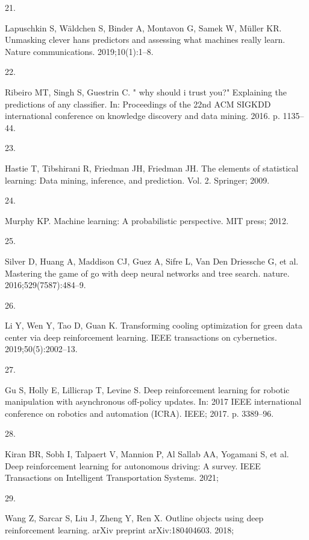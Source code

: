\documentclass[
  10pt,
]{scrbook}
\newlength{\cslhangindent}
\newlength{\csllabelwidth}
\newlength{\cslentryspacingunit} %
\newenvironment{CSLReferences}[2] %
 {%
  \setlength{\parindent}{0pt}
  \ifodd #1
  \let\oldpar\par
  \def\par{\hangindent=\cslhangindent\oldpar}
  \fi
  \setlength{\parskip}{#2\cslentryspacingunit}
 }%
 {}
\newcommand{\CSLLeftMargin}[1]{\parbox[t]{\csllabelwidth}{#1}}
\newcommand{\CSLRightInline}[1]{\parbox[t]{\linewidth - \csllabelwidth}{#1}\break}
\begin{document}
\begin{CSLReferences}{0}{0}
\leavevmode{}%
\CSLLeftMargin{21. }
\CSLRightInline{Lapuschkin S, Wäldchen S, Binder A, Montavon G, Samek W, Müller KR. Unmasking clever hans predictors and assessing what machines really learn. Nature communications. 2019;10(1):1--8. }

\leavevmode{}%
\CSLLeftMargin{22. }
\CSLRightInline{Ribeiro MT, Singh S, Guestrin C. " why should i trust you?" Explaining the predictions of any classifier. In: Proceedings of the 22nd ACM SIGKDD international conference on knowledge discovery and data mining. 2016. p. 1135--44. }

\leavevmode{}%
\CSLLeftMargin{23. }
\CSLRightInline{Hastie T, Tibshirani R, Friedman JH, Friedman JH. The elements of statistical learning: Data mining, inference, and prediction. Vol. 2. Springer; 2009. }

\leavevmode{}%
\CSLLeftMargin{24. }
\CSLRightInline{Murphy KP. Machine learning: A probabilistic perspective. MIT press; 2012. }

\leavevmode{}%
\CSLLeftMargin{25. }
\CSLRightInline{Silver D, Huang A, Maddison CJ, Guez A, Sifre L, Van Den Driessche G, et al. Mastering the game of go with deep neural networks and tree search. nature. 2016;529(7587):484--9. }

\leavevmode{}%
\CSLLeftMargin{26. }
\CSLRightInline{Li Y, Wen Y, Tao D, Guan K. Transforming cooling optimization for green data center via deep reinforcement learning. IEEE transactions on cybernetics. 2019;50(5):2002--13. }

\leavevmode{}%
\CSLLeftMargin{27. }
\CSLRightInline{Gu S, Holly E, Lillicrap T, Levine S. Deep reinforcement learning for robotic manipulation with asynchronous off-policy updates. In: 2017 IEEE international conference on robotics and automation (ICRA). IEEE; 2017. p. 3389--96. }

\leavevmode{}%
\CSLLeftMargin{28. }
\CSLRightInline{Kiran BR, Sobh I, Talpaert V, Mannion P, Al Sallab AA, Yogamani S, et al. Deep reinforcement learning for autonomous driving: A survey. IEEE Transactions on Intelligent Transportation Systems. 2021; }

\leavevmode{}%
\CSLLeftMargin{29. }
\CSLRightInline{Wang Z, Sarcar S, Liu J, Zheng Y, Ren X. Outline objects using deep reinforcement learning. arXiv preprint arXiv:180404603. 2018; }


\end{CSLReferences}
\end{document}

